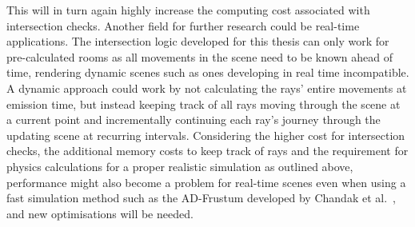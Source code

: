 This will in turn again highly increase the computing cost associated with intersection checks.
\newline
Another field for further research could be real-time applications.
The intersection logic developed for this thesis can only work for pre-calculated rooms
as all movements in the scene need to be known ahead of time,
rendering dynamic scenes such as ones developing in real time incompatible.
\newline
A dynamic approach could work by not calculating the rays' entire movements at emission time,
but instead keeping track of all rays moving through the scene at a current point
and incrementally continuing each ray's journey through the updating scene at recurring intervals.
\newline
Considering the higher cost for intersection checks,
the additional memory costs to keep track of rays
and the requirement for physics calculations for a proper realistic simulation as outlined above,
performance might also become a problem for real-time scenes
even when using a fast simulation method such as the AD-Frustum developed by Chandak et al.~\cite{Cha08},
and new optimisations will be needed.
